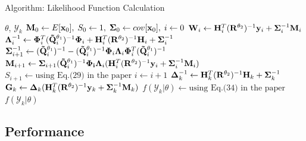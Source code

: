 \begin{frame}{Algorithm: Likelihood Function Calculation}

\begin{algorithm}[H]
\caption{Factor-Graph-Based Likelihood Function Calculation}
\begin{algorithmic}[1]
\REQUIRE $\theta$, $\mathcal{Y}_k$
\STATE ${\bf M}_0 \leftarrow E[{\bf x}_0],\; S_0 \leftarrow 1,\; {\bf \Sigma}_0 \leftarrow cov[{\bf x}_0], \; i \leftarrow 0$
    \STATE ${\bf W}_i\leftarrow {\bf H}_i^T({\bf R}^{\theta_2})^{-1}{\bf y}_i + {\bf \Sigma}_i^{-1}{\bf M}_i$
    \STATE ${\bf \Lambda}_i^{-1}\leftarrow {\bf \Phi}_i^T({\bf \tilde Q}_i^{\theta_1})^{-1}{\bf \Phi}_i + {\bf H}_i^{T}({\bf R}^{\theta_2})^{-1}{\bf H}_i+{\bf \Sigma}_i^{-1}$
    \STATE ${\bf \Sigma}_{i+1}^{-1}\leftarrow ({\bf \tilde Q}_i^{\theta_1})^{-1} - ({\bf \tilde Q}_i^{\theta_1})^{-1}{\bf \Phi}_i{\bf \Lambda}_i{\bf \Phi}_i^T({\bf \tilde Q}_i^{\theta_1})^{-1}$
    \STATE ${\bf M}_{i+1}\leftarrow {\bf \Sigma}_{i+1}({\bf \tilde Q}_i^{\theta_1})^{-1}{\bf \Phi_i}{\bf \Lambda}_i({\bf H}_i^T({\bf R}^{\theta_2})^{-1}{\bf y}_i+{\bf \Sigma}_i^{-1}{\bf M}_i)$
    \STATE $S_{i+1} \leftarrow \text{using Eq.(29) in the paper}$
    \STATE $i \leftarrow i+1$
\ENDWHILE
\STATE ${\bf \Delta}_k^{-1}\leftarrow {\bf H}_k^T({\bf R}^{\theta_2})^{-1}{\bf H}_k + {\bf \Sigma}_k^{-1}$
\STATE ${\bf G}_k \leftarrow {\bf \Delta}_k({\bf H}_k^T({\bf R}^{\theta_2})^{-1}{\bf y}_k + {\bf \Sigma}_k^{-1}{\bf M}_k)$
\STATE $f(\mathcal{Y}_k|\theta) \leftarrow \text{using Eq.(34) in the paper}$
\ENSURE $f(\mathcal{Y}_k|\theta)$
\end{algorithmic}
\end{algorithm}
\end{frame}

\subsection{Performance}

